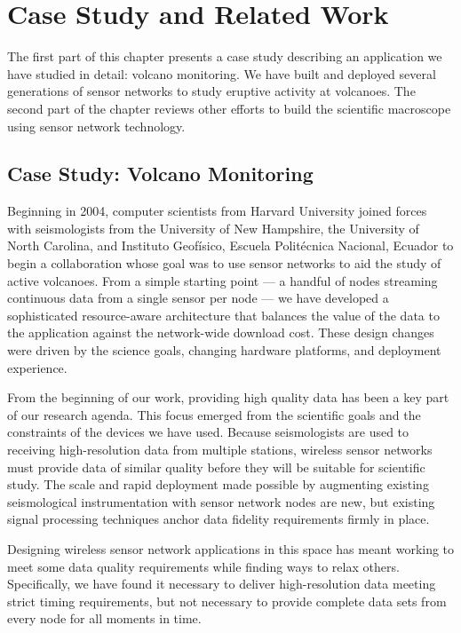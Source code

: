 \chapter{Case Study and Related Work}
\label{chapter-related}

The first part of this chapter presents a case study describing an
application we have studied in detail: volcano monitoring. We have built and
deployed several generations of sensor networks to study eruptive activity at
volcanoes. The second part of the chapter reviews other efforts to build the
scientific macroscope using sensor network technology.

\section{Case Study: Volcano Monitoring}

Beginning in 2004, computer scientists from Harvard University joined forces
with seismologists from the University of New Hampshire, the University of
North Carolina, and Instituto Geof\'{i}sico, Escuela Polit\'{e}cnica
Nacional, Ecuador to begin a collaboration whose goal was to use sensor
networks to aid the study of active volcanoes. From a simple starting point
--- a handful of nodes streaming continuous data from a single sensor per
node --- we have developed a sophisticated resource-aware architecture that
balances the value of the data to the application against the network-wide
download cost. These design changes were driven by the science goals,
changing hardware platforms, and deployment experience.

\clearpage

From the beginning of our work, providing high quality data has been a key
part of our research agenda. This focus emerged from the scientific goals and
the constraints of the devices we have used. Because seismologists are used
to receiving high-resolution data from multiple stations, wireless sensor
networks must provide data of similar quality before they will be suitable
for scientific study. The scale and rapid deployment made possible by
augmenting existing seismological instrumentation with sensor network nodes
are new, but existing signal processing techniques anchor data fidelity
requirements firmly in place.

Designing wireless sensor network applications in this space has meant
working to meet some data quality requirements while finding ways to relax
others. Specifically, we have found it necessary to deliver high-resolution
data meeting strict timing requirements, but not necessary to provide
complete data sets from every node for all moments in time.

